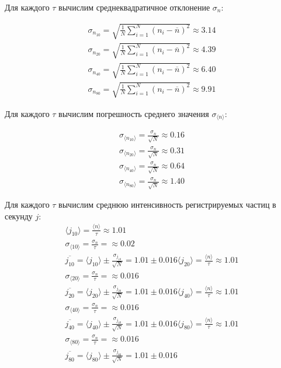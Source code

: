 \documentclass[a4paper, 12pt]{article}
\begin{document}
Для каждого $\tau$ вычислим среднеквадратичное отклонение $\sigma_{n}$:  

\begin{equation*}
  \begin{aligned}
        \sigma_{n_{10}} = \sqrt{\frac{1}{N}\sum_{i=1}^N{(n_i-\overline{n})^2}} \approx 3.14\\
        \sigma_{n_{20}} = \sqrt{\frac{1}{N}\sum_{i=1}^N{(n_i-\overline{n})^2}} \approx 4.39\\
        \sigma_{n_{40}} = \sqrt{\frac{1}{N}\sum_{i=1}^N{(n_i-\overline{n})^2}} \approx 6.40\\
        \sigma_{n_{80}} = \sqrt{\frac{1}{N}\sum_{i=1}^N{(n_i-\overline{n})^2}} \approx 9.91
  \end{aligned}
\end{equation*}

Для каждого $\tau$ вычислим погрешность среднего значения $\sigma_{\langle n \rangle}$:  

\begin{equation*}
  \begin{aligned}
        \sigma_{\langle n_{10} \rangle} = \frac{\sigma_{n}}{\sqrt{N}} \approx 0.16\\ 
        \sigma_{\langle n_{20} \rangle} = \frac{\sigma_{n}}{\sqrt{N}} \approx 0.31\\
        \sigma_{\langle n_{40} \rangle} = \frac{\sigma_{n}}{\sqrt{N}} \approx 0.64\\
        \sigma_{\langle n_{80} \rangle} = \frac{\sigma_{n}}{\sqrt{N}} \approx 1.40 
  \end{aligned}
\end{equation*}


\newpage
Для каждого $\tau$ вычислим среднюю интенсивность регистрируемых частиц в секунду $j$:  
\begin{gather*}
    \langle j_{10} \rangle = \frac{\langle n \rangle}{\tau} \approx 1.01\\ 
    \sigma_{\langle 10 \rangle} = \frac{\sigma_{n}}{\tau} =  \approx 0.02\\
    \overline{j_{10}} = \langle j_{10} \rangle \pm \frac{\sigma_{j_{10}}}{\sqrt{N}} = 1.01 \pm 0.016
    \langle j_{20} \rangle = \frac{\langle n \rangle}{\tau} \approx 1.01\\ 
    \sigma_{\langle 20 \rangle} = \frac{\sigma_{n}}{\tau} =  \approx 0.016\\
    \overline{j_{20}} = \langle j_{20} \rangle \pm \frac{\sigma_{j_{20}}}{\sqrt{N}} = 1.01 \pm 0.016 
    \langle j_{40} \rangle = \frac{\langle n \rangle}{\tau} \approx 1.01\\ 
    \sigma_{\langle 40 \rangle} = \frac{\sigma_{n}}{\tau} =  \approx 0.016\\
    \overline{j_{40}} = \langle j_{40} \rangle \pm \frac{\sigma_{j_{40}}}{\sqrt{N}} = 1.01 \pm 0.016
        \langle j_{80} \rangle = \frac{\langle n \rangle}{\tau} \approx 1.01\\ 
    \sigma_{\langle 80 \rangle} = \frac{\sigma_{n}}{\tau} =  \approx 0.016\\
    \overline{j_{80}} = \langle j_{80} \rangle \pm \frac{\sigma_{j_{80}}}{\sqrt{N}} = 1.01 \pm 0.016
\end{gather*}
\end{document}
